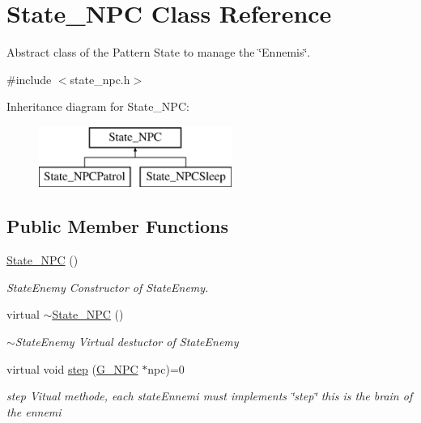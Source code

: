 \hypertarget{class_state___n_p_c}{}\section{State\+\_\+\+N\+P\+C Class Reference}
\label{class_state___n_p_c}


Abstract class of the Pattern State to manage the \char`\"{}\+Ennemis\char`\"{}.  




{\ttfamily \#include $<$state\+\_\+npc.\+h$>$}

Inheritance diagram for State\+\_\+\+N\+P\+C\+:\begin{figure}[H]
\begin{center}
\leavevmode
\includegraphics[height=2.000000cm]{class_state___n_p_c}
\end{center}
\end{figure}
\subsection*{Public Member Functions}
\begin{DoxyCompactItemize}
\item 
\hypertarget{class_state___n_p_c_a81773e7a148bc212a31f223bc1c3de6d}{}\hyperlink{class_state___n_p_c_a81773e7a148bc212a31f223bc1c3de6d}{State\+\_\+\+N\+P\+C} ()\label{class_state___n_p_c_a81773e7a148bc212a31f223bc1c3de6d}

\begin{DoxyCompactList}\small\item\em State\+Enemy Constructor of State\+Enemy. \end{DoxyCompactList}\item 
\hypertarget{class_state___n_p_c_a18bce4b30a3b39894e7ee868d2b75e5e}{}virtual \hyperlink{class_state___n_p_c_a18bce4b30a3b39894e7ee868d2b75e5e}{$\sim$\+State\+\_\+\+N\+P\+C} ()\label{class_state___n_p_c_a18bce4b30a3b39894e7ee868d2b75e5e}

\begin{DoxyCompactList}\small\item\em $\sim$\+State\+Enemy Virtual destuctor of State\+Enemy \end{DoxyCompactList}\item 
virtual void \hyperlink{class_state___n_p_c_a4123003789e88b4d40b47f49c6c84b04}{step} (\hyperlink{class_g___n_p_c}{G\+\_\+\+N\+P\+C} $\ast$npc)=0
\begin{DoxyCompactList}\small\item\em step Vitual methode, each state\+Ennemi must implements \char`\"{}step\char`\"{} this is the brain of the ennemi \end{DoxyCompactList}\end{DoxyCompactItemize}


